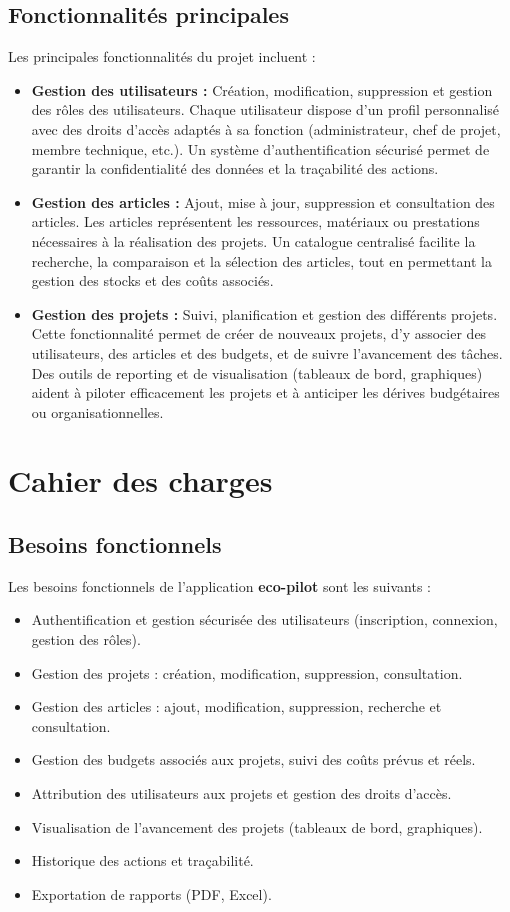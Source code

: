 \documentclass[12pt,a4paper]{report}
\begin{document}
\section{Fonctionnalités principales}
Les principales fonctionnalités du projet incluent :
\begin{itemize}
    \item \textbf{Gestion des utilisateurs :} Création, modification, suppression et gestion des rôles des utilisateurs. Chaque utilisateur dispose d’un profil personnalisé avec des droits d’accès adaptés à sa fonction (administrateur, chef de projet, membre technique, etc.). Un système d’authentification sécurisé permet de garantir la confidentialité des données et la traçabilité des actions.
    \item \textbf{Gestion des articles :} Ajout, mise à jour, suppression et consultation des articles. Les articles représentent les ressources, matériaux ou prestations nécessaires à la réalisation des projets. Un catalogue centralisé facilite la recherche, la comparaison et la sélection des articles, tout en permettant la gestion des stocks et des coûts associés.
    \item \textbf{Gestion des projets :} Suivi, planification et gestion des différents projets. Cette fonctionnalité permet de créer de nouveaux projets, d’y associer des utilisateurs, des articles et des budgets, et de suivre l’avancement des tâches. Des outils de reporting et de visualisation (tableaux de bord, graphiques) aident à piloter efficacement les projets et à anticiper les dérives budgétaires ou organisationnelles.
\end{itemize}

\chapter{Cahier des charges}
\section{Besoins fonctionnels}

Les besoins fonctionnels de l’application \textbf{eco-pilot} sont les suivants :
\begin{itemize}
    \item Authentification et gestion sécurisée des utilisateurs (inscription, connexion, gestion des rôles).
    \item Gestion des projets : création, modification, suppression, consultation.
    \item Gestion des articles : ajout, modification, suppression, recherche et consultation.
    \item Gestion des budgets associés aux projets, suivi des coûts prévus et réels.
    \item Attribution des utilisateurs aux projets et gestion des droits d’accès.
    \item Visualisation de l’avancement des projets (tableaux de bord, graphiques).
    \item Historique des actions et traçabilité.
    \item Exportation de rapports (PDF, Excel).
\end{itemize}
\end{document}
